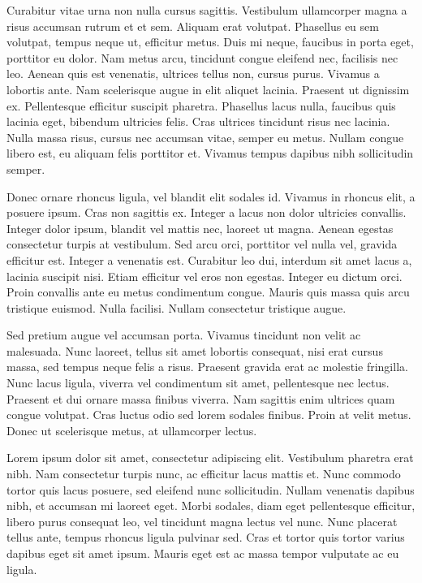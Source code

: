 \documentclass[a4paper]{memoir}
\begin{document}
Curabitur vitae urna non nulla cursus sagittis. Vestibulum ullamcorper magna a risus accumsan rutrum et et sem. Aliquam erat volutpat. Phasellus eu sem volutpat, tempus neque ut, efficitur metus. Duis mi neque, faucibus in porta eget, porttitor eu dolor. Nam metus arcu, tincidunt congue eleifend nec, facilisis nec leo. Aenean quis est venenatis, ultrices tellus non, cursus purus. Vivamus a lobortis ante. Nam scelerisque augue in elit aliquet lacinia. Praesent ut dignissim ex. Pellentesque efficitur suscipit pharetra. Phasellus lacus nulla, faucibus quis lacinia eget, bibendum ultricies felis. Cras ultrices tincidunt risus nec lacinia. Nulla massa risus, cursus nec accumsan vitae, semper eu metus. Nullam congue libero est, eu aliquam felis porttitor et. Vivamus tempus dapibus nibh sollicitudin semper. 

Donec ornare rhoncus ligula, vel blandit elit sodales id. Vivamus in rhoncus elit, a posuere ipsum. Cras non sagittis ex. Integer a lacus non dolor ultricies convallis. Integer dolor ipsum, blandit vel mattis nec, laoreet ut magna. Aenean egestas consectetur turpis at vestibulum. Sed arcu orci, porttitor vel nulla vel, gravida efficitur est. Integer a venenatis est. Curabitur leo dui, interdum sit amet lacus a, lacinia suscipit nisi. Etiam efficitur vel eros non egestas. Integer eu dictum orci. Proin convallis ante eu metus condimentum congue. Mauris quis massa quis arcu tristique euismod. Nulla facilisi. Nullam consectetur tristique augue. 

Sed pretium augue vel accumsan porta. Vivamus tincidunt non velit ac malesuada. Nunc laoreet, tellus sit amet lobortis consequat, nisi erat cursus massa, sed tempus neque felis a risus. Praesent gravida erat ac molestie fringilla. Nunc lacus ligula, viverra vel condimentum sit amet, pellentesque nec lectus. Praesent et dui ornare massa finibus viverra. Nam sagittis enim ultrices quam congue volutpat. Cras luctus odio sed lorem sodales finibus. Proin at velit metus. Donec ut scelerisque metus, at ullamcorper lectus. 

Lorem ipsum dolor sit amet, consectetur adipiscing elit. Vestibulum pharetra erat nibh. Nam consectetur turpis nunc, ac efficitur lacus mattis et. Nunc commodo tortor quis lacus posuere, sed eleifend nunc sollicitudin. Nullam venenatis dapibus nibh, et accumsan mi laoreet eget. Morbi sodales, diam eget pellentesque efficitur, libero purus consequat leo, vel tincidunt magna lectus vel nunc. Nunc placerat tellus ante, tempus rhoncus ligula pulvinar sed. Cras et tortor quis tortor varius dapibus eget sit amet ipsum. Mauris eget est ac massa tempor vulputate ac eu ligula. 
\end{document}
